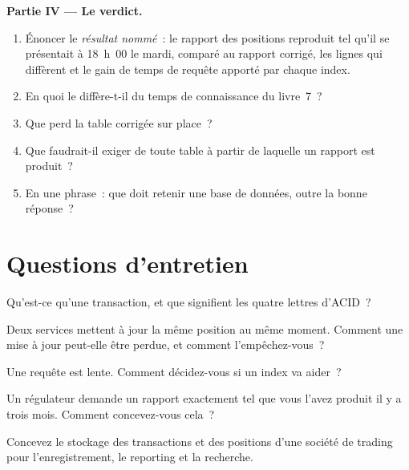 \begin{problem}
\medskip\noindent\textbf{Partie IV --- Le verdict.}
\begin{enumerate}[resume]
\item Énoncer le \emph{résultat nommé}~: le rapport des positions reproduit tel qu'il se présentait à 18~h~00 le mardi, comparé au rapport corrigé, les
lignes qui diffèrent et le gain de temps de requête apporté par chaque index.
\item En quoi le  diffère-t-il du temps de connaissance du livre~7~?
\item Que perd la table corrigée sur place~?
\item Que faudrait-il exiger de toute table à partir de laquelle un rapport est produit~?
\item En une phrase~: que doit retenir une base de données, outre la bonne réponse~?
\end{enumerate}
\end{problem}

\section{Questions d'entretien}

\begin{interviewq}\label{iq:pl:databases-and-sql:1}
Qu'est-ce qu'une transaction, et que signifient les quatre lettres d'ACID~?
\end{interviewq}

\begin{interviewq}\label{iq:pl:databases-and-sql:2}
Deux services mettent à jour la même position au même moment. Comment une mise à jour peut-elle être perdue, et comment l'empêchez-vous~?
\end{interviewq}

\begin{interviewq}\label{iq:pl:databases-and-sql:3}
Une requête est lente. Comment décidez-vous si un index va aider~?
\end{interviewq}

\begin{interviewq}\label{iq:pl:databases-and-sql:4}
Un régulateur demande un rapport exactement tel que vous l'avez produit il y a trois mois. Comment concevez-vous cela~?
\end{interviewq}

\begin{interviewq}\label{iq:pl:databases-and-sql:5}
Concevez le stockage des transactions et des positions d'une société de trading pour l'enregistrement, le reporting et la recherche.
\end{interviewq}
